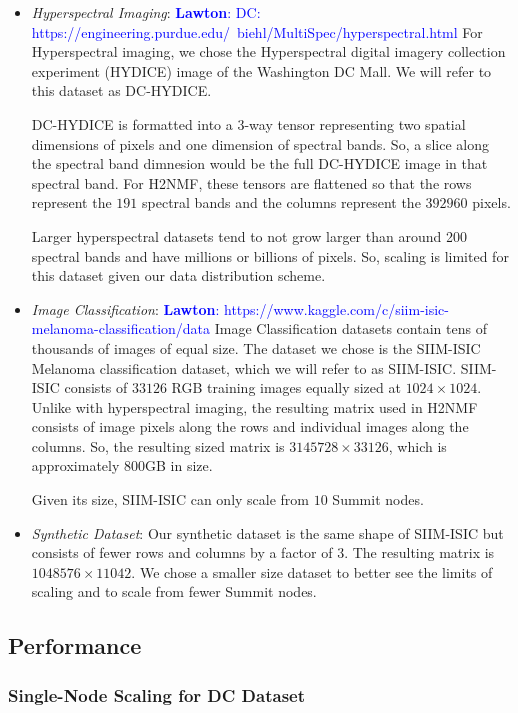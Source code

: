 \documentclass[conference,compsoc]{IEEEtran}
\newcommand{\LM}[1]{\textcolor{blue}{\textbf{Lawton}: #1}}
\newcommand{\hyper}{DC-HYDICE}
\newcommand{\image}{SIIM-ISIC}
\begin{document}
\begin{itemize}
	\item \textit{Hyperspectral Imaging}:
	\LM{DC: https://engineering.purdue.edu/~biehl/MultiSpec/hyperspectral.html}
	For Hyperspectral imaging, we chose the Hyperspectral digital imagery collection experiment (HYDICE) image of the Washington DC Mall. We will refer
	to this dataset as \hyper{}.
	
	\hyper{} is formatted into a 3-way tensor representing two spatial dimensions of pixels and one dimension of spectral bands. So, a slice along
	the spectral band dimnesion would be the full \hyper{} image in that spectral band. For H2NMF, these tensors are flattened so that the rows represent the
	$191$ spectral bands and the columns represent the $392960$ pixels. 

	Larger hyperspectral datasets tend to not grow larger than around 200 spectral bands and have millions or billions of pixels. So, scaling is 
	limited for this dataset given our data distribution scheme.
	\item \textit{Image Classification}:
	\LM{https://www.kaggle.com/c/siim-isic-melanoma-classification/data}
	Image Classification datasets contain tens of thousands of images of equal size. The dataset we chose is the SIIM-ISIC Melanoma classification
	dataset, which we will refer to as \image{}. \image{} consists of $33126$ RGB training images equally sized at $1024 \times 1024$. Unlike with hyperspectral imaging, the resulting
	matrix used in H2NMF consists of image pixels along the rows and individual images along the columns. So, the resulting sized matrix is
	$3145728 \times 33126$, which is approximately 800GB in size. 

	Given its size, \image{} can only scale from $10$ Summit nodes.
	\item \textit{Synthetic Dataset}:
	Our synthetic dataset is the same shape of \image{} but consists of fewer rows and columns by a factor of $3$. The resulting matrix is $1048576 \times 11042$. 
	We chose a smaller size dataset to better see the limits of scaling and to scale from fewer Summit nodes.
\end{itemize}

\subsection{Performance}
\label{sec:perf}

\subsubsection{Single-Node Scaling for DC Dataset}
\end{document}
